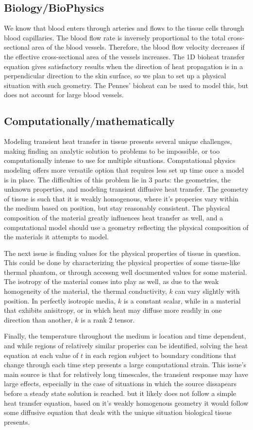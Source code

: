 \documentclass[12pt]{article}
\begin{document}
\subsection{Biology/BioPhysics}
\indent We know that blood enters through arteries and flows to the tissue cells through blood capillaries. The blood flow rate is inversely proportional to the total cross-sectional area of the blood vessels. Therefore, the blood flow velocity decreases if the effective cross-sectional area of the vessels increases. The 1D bioheat transfer equation gives satisfactory results when the direction of heat propagation is in a perpendicular direction to the skin surface, so we plan to set up a physical situation with such geometry. The Pennes' bioheat can be used to model this, but does not account for large blood vessels. 
	
\subsection{Computationally/mathematically}
Modeling transient heat transfer in tissue presents several unique challenges, making finding an analytic solution to problems to be impossible, or too computationally intense to use for multiple situations. Computational physics modeling offers more versatile option that requires less set up time once a model is in place. The difficulties of this problem lie in 3 parts: the geometries, the unknown properties, and modeling transient diffusive heat transfer.
The geometry of tissue is such that it is weakly homogenous, where it's properies vary within the medium based on position, but stay reasonably consistent. The physical composition of the material greatly influences heat transfer as well, and a computational model should use a geometry reflecting the physical composition of the materials it attempts to model. 

The next issue is finding values for the physical properties of tissue in question. This could be done by characterizing the physical properties of some tissue-like thermal phantom, or through accessng well documented values for some material. The isotropy of the material comes into play as well, as due to the weak homogeneity of the material, the thermal conductivity, $k$ can vary slightly with position. In perfectly isotropic media, $k$ is a constant scalar, while in a material that exhibits anisitropy, or in which heat may diffuse more readily in one direction than another, $k$ is a rank 2 tensor. 

Finally, the temperature throughout the medium is location and time dependent, and while regions of relatively similar properies can be identified, solving the heat equation at each value of $t$ in each region subject to boundary conditions that change through each time step presents a large computational strain. This issue's main source is that for relatively long timescales, the transient response may have large effects, especially in the case of situations in which the source dissapears before a steady state solution is reached. but it likely does not follow a simple heat transfer equation, based on it's weakly homogenous geometry it would follow some diffusive equation that deals with the unique situation biological tissue presents.
\end{document}
